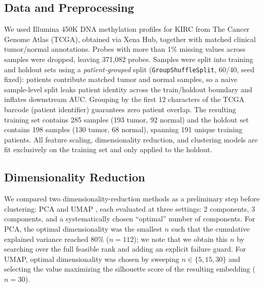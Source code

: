 \documentclass[sigconf]{acmart}
\begin{document}
\subsection{Data and Preprocessing}
We used Illumina 450K DNA methylation profiles for KIRC from The Cancer Genome Atlas (TCGA), obtained via Xena Hub, together with matched clinical tumor/normal annotations. Probes with more than 1\% missing values across samples were dropped, leaving 371{,}082 probes. Samples were split into training and holdout sets using a \emph{patient-grouped} split (\texttt{GroupShuffleSplit}, 60/40, seed fixed): patients contribute matched tumor and normal samples, so a naive sample-level split leaks patient identity across the train/holdout boundary and inflates downstream AUC. Grouping by the first 12 characters of the TCGA barcode (patient identifier) guarantees zero patient overlap. The resulting training set contains 285 samples (193 tumor, 92 normal) and the holdout set contains 198 samples (130 tumor, 68 normal), spanning 191 unique training patients. All feature scaling, dimensionality reduction, and clustering models are fit exclusively on the training set and only applied to the holdout.

\subsection{Dimensionality Reduction}
We compared two dimensionality-reduction methods as a preliminary step before clustering: PCA and UMAP \cite{mcinnes2018umap}, each evaluated at three settings: 2 components, 3 components, and a systematically chosen ``optimal'' number of components. For PCA, the optimal dimensionality was the smallest $n$ such that the cumulative explained variance reached 80\% ($n=112$); we note that we obtain this $n$ by searching over the full feasible rank and adding an explicit failure guard. For UMAP, optimal dimensionality was chosen by sweeping $n \in \{5, 15, 30\}$ and selecting the value maximizing the silhouette score of the resulting embedding ($n=30$).
\end{document}
